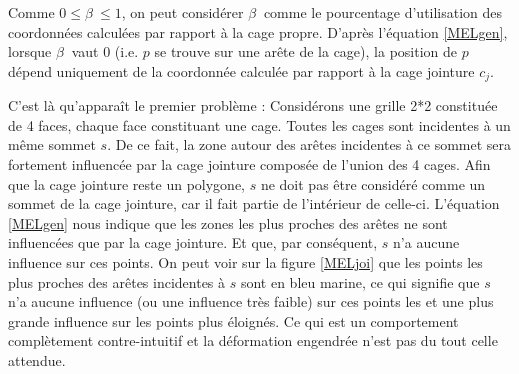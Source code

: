 Comme $0 \leq \beta~ \leq 1$, on peut considérer $\beta~$ comme le
pourcentage d'utilisation des coordonnées calculées par rapport à la
cage propre. D'après l'équation \ref{MELgen}, lorsque $\beta~$ vaut 0
(i.e. $p$ se trouve sur une arête de la cage), la position de $p$
dépend uniquement de la coordonnée calculée par rapport à la cage
jointure $c_j$.

C'est là qu'apparaît le premier problème : Considérons une grille 2*2
constituée de 4 faces, chaque face constituant une cage. Toutes les
cages sont incidentes à un même sommet $s$. De ce fait, la zone autour
des arêtes incidentes à ce sommet sera fortement influencée par la
cage jointure composée de l'union des 4 cages. Afin que la cage
jointure reste un polygone, $s$ ne doit pas être considéré comme un
sommet de la cage jointure, car il fait partie de l'intérieur de
celle-ci. L'équation \ref{MELgen} nous indique que les zones les plus
proches des arêtes ne sont influencées que par la cage jointure. Et
que, par conséquent, $s$ n'a aucune influence sur ces points. On peut
voir sur la figure \ref{MELjoi} que les points les plus proches des
arêtes incidentes à $s$ sont en bleu marine, ce qui signifie que $s$
n'a aucune influence (ou une influence très faible) sur ces points les
et une plus grande influence sur les points plus éloignés. Ce qui est
un comportement complètement contre-intuitif et la déformation
engendrée n'est pas du tout celle attendue.

